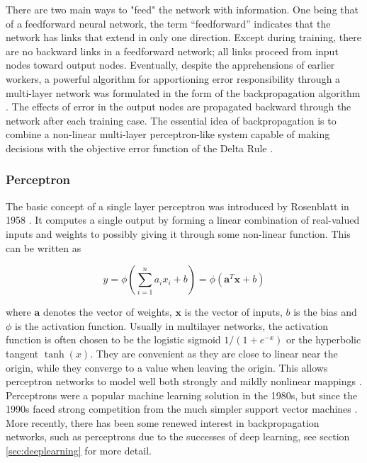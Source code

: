 There are two main ways to "feed" the network with information. One being that of a feedforward neural network, the term “feedforward” indicates that the network has links that extend in only one direction. Except during training, there are no backward links in a feedforward network; all links proceed from input nodes toward output nodes. Eventually, despite the apprehensions of earlier workers, a powerful algorithm for apportioning error responsibility through a multi-layer network was formulated in the form of the backpropagation algorithm \cite{backpro}. The effects of error in the output nodes are propagated backward through the network after each training case. The essential idea of backpropagation is to combine a non-linear multi-layer perceptron-like system capable of making decisions with the objective error function of the Delta Rule \cite{backpro}.

\pagebreak
\subsubsection{Perceptron}
\label{sec:perceptron}
The basic concept of a single layer perceptron was introduced by Rosenblatt in 1958 \cite{perceptron}. It computes a single output by forming a linear combination of real-valued inputs and weights to possibly giving it through some non-linear function. This can be written as

\begin{equation} 
 y = \phi( \sum\limits_{i=1}^n a_i x_i + b ) = \phi( \mathbf{a}^T \mathbf{x}+ b )
\end{equation}

where  $\mathbf{a}$ denotes the vector of weights,  $ \mathbf{x}$ is the vector of inputs, $ b$ is the bias and $ \phi$ is the activation function. Usually in multilayer networks, the activation function is often chosen to be the logistic sigmoid $ 1 / (1 + e^{-x})$ or the hyperbolic tangent $ \tanh(x)$. They are convenient as they are close to linear near the origin, while they converge to a value when leaving the origin. This allows perceptron networks to model well both strongly and mildly nonlinear mappings \cite{nonlinear}. Perceptrons were a popular machine learning solution in the 1980s, but since the 1990s faced strong competition from the much simpler support vector machines \cite{svm}. More recently, there has been some renewed interest in backpropagation networks, such as perceptrons due to the successes of deep learning, see section \ref{sec:deeplearning} for more detail.


